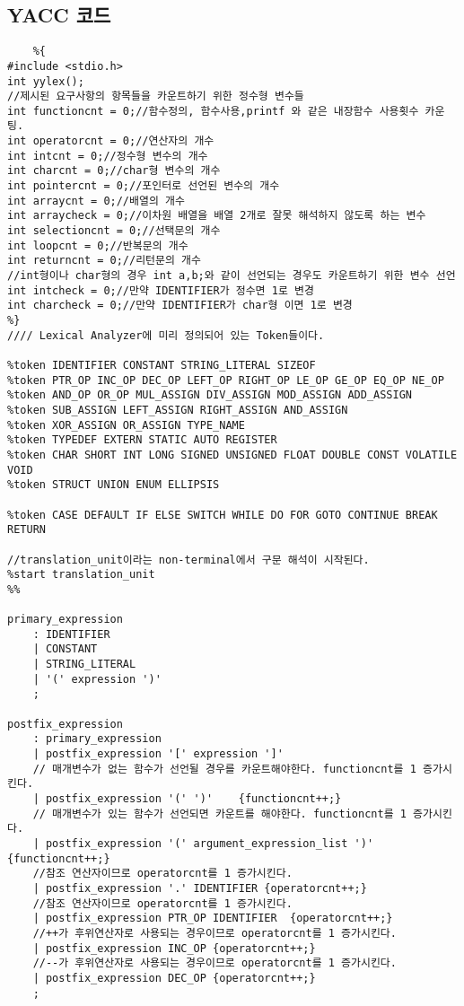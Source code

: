 \documentclass{article}
\begin{document}
\subsection{YACC 코드}
\begin{verbatim}
    %{
#include <stdio.h>
int yylex();
//제시된 요구사항의 항목들을 카운트하기 위한 정수형 변수들
int functioncnt = 0;//함수정의, 함수사용,printf 와 같은 내장함수 사용횟수 카운팅.
int operatorcnt = 0;//연산자의 개수
int intcnt = 0;//정수형 변수의 개수
int charcnt = 0;//char형 변수의 개수
int pointercnt = 0;//포인터로 선언된 변수의 개수
int arraycnt = 0;//배열의 개수
int arraycheck = 0;//이차원 배열을 배열 2개로 잘못 해석하지 않도록 하는 변수
int selectioncnt = 0;//선택문의 개수
int loopcnt = 0;//반복문의 개수
int returncnt = 0;//리턴문의 개수
//int형이나 char형의 경우 int a,b;와 같이 선언되는 경우도 카운트하기 위한 변수 선언
int intcheck = 0;//만약 IDENTIFIER가 정수면 1로 변경
int charcheck = 0;//만약 IDENTIFIER가 char형 이면 1로 변경
%}
//// Lexical Analyzer에 미리 정의되어 있는 Token들이다.

%token IDENTIFIER CONSTANT STRING_LITERAL SIZEOF
%token PTR_OP INC_OP DEC_OP LEFT_OP RIGHT_OP LE_OP GE_OP EQ_OP NE_OP
%token AND_OP OR_OP MUL_ASSIGN DIV_ASSIGN MOD_ASSIGN ADD_ASSIGN
%token SUB_ASSIGN LEFT_ASSIGN RIGHT_ASSIGN AND_ASSIGN
%token XOR_ASSIGN OR_ASSIGN TYPE_NAME
%token TYPEDEF EXTERN STATIC AUTO REGISTER
%token CHAR SHORT INT LONG SIGNED UNSIGNED FLOAT DOUBLE CONST VOLATILE VOID
%token STRUCT UNION ENUM ELLIPSIS

%token CASE DEFAULT IF ELSE SWITCH WHILE DO FOR GOTO CONTINUE BREAK RETURN

//translation_unit이라는 non-terminal에서 구문 해석이 시작된다.
%start translation_unit
%%

primary_expression
	: IDENTIFIER
	| CONSTANT
	| STRING_LITERAL
	| '(' expression ')'
	;

postfix_expression
	: primary_expression
	| postfix_expression '[' expression ']'
	// 매개변수가 없는 함수가 선언될 경우를 카운트해야한다. functioncnt를 1 증가시킨다.
	| postfix_expression '(' ')'	{functioncnt++;}
	// 매개변수가 있는 함수가 선언되면 카운트를 해야한다. functioncnt를 1 증가시킨다.
	| postfix_expression '(' argument_expression_list ')'	{functioncnt++;}
	//참조 연산자이므로 operatorcnt를 1 증가시킨다.
	| postfix_expression '.' IDENTIFIER	{operatorcnt++;}
	//참조 연산자이므로 operatorcnt를 1 증가시킨다.
	| postfix_expression PTR_OP IDENTIFIER	{operatorcnt++;}
	//++가 후위연산자로 사용되는 경우이므로 operatorcnt를 1 증가시킨다.
	| postfix_expression INC_OP	{operatorcnt++;}
	//--가 후위연산자로 사용되는 경우이므로 operatorcnt를 1 증가시킨다.
	| postfix_expression DEC_OP	{operatorcnt++;}
	;


\end{verbatim}
\end{document}
